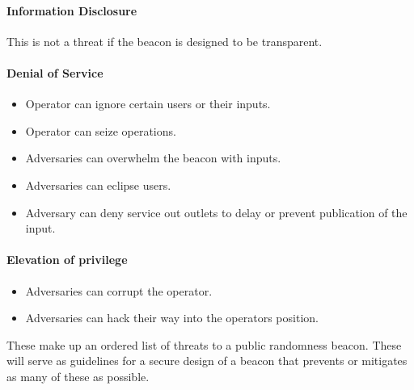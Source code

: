 \paragraph{Information Disclosure} This is not a threat if the beacon is designed to be transparent.


\paragraph{Denial of Service}
\begin{itemize}
    \item Operator can ignore certain users or their inputs.
    \item Operator can seize operations.
    \item Adversaries can overwhelm the beacon with inputs.
    \item Adversaries can eclipse users.
    \item Adversary can deny service out outlets to delay or prevent publication of the input.
\end{itemize}

\paragraph{Elevation of privilege}
\begin{itemize}
    \item Adversaries can corrupt the operator.
    \item Adversaries can hack their way into the operators position.
\end{itemize}

These make up an ordered list of threats to a public randomness beacon. These will serve as guidelines for a secure design of a beacon that prevents or mitigates as many of these as possible.
